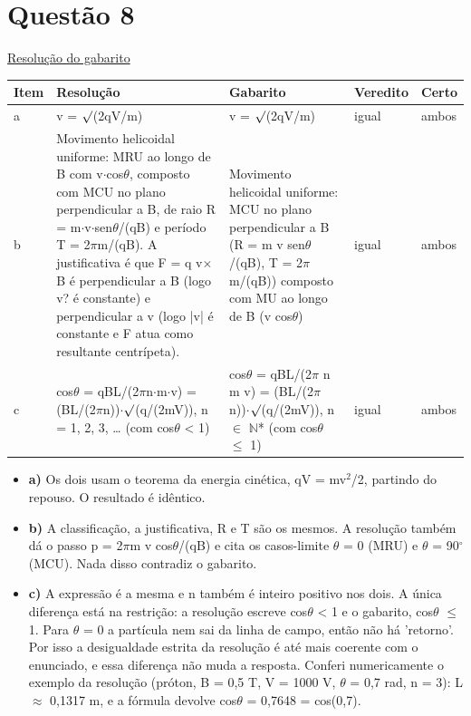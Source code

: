 \documentclass{article}%
\begin{document}
\section*{Questão 8}%
\href{https://poliedroresolve.sistemapoliedro.com.br/vestibulares/ita/2027/ita-2-fase-dia-3-22-10-2026-2-fase-dia-3/dissertativa-8-fisica-2-fase-dia-3-ita-2027}{Resolução do gabarito}\par\smallskip%
\begin{longtable}{@{}p{} p{} p{} p{} p{}@{}}\toprule Item & Resolução & Gabarito & Veredito & Certo \\ \midrule
a & v = $\surd$(2qV/m) & v = $\surd$(2qV/m) & igual & ambos \\
b & Movimento helicoidal uniforme: MRU ao longo de B com v$\cdot$cos$\theta$, composto com MCU no plano perpendicular a B, de raio R = m$\cdot$v$\cdot$sen$\theta$/(qB) e período T = 2$\pi$m/(qB). A justificativa é que F = q v$\times$B é perpendicular a B (logo v? é constante) e perpendicular a v (logo |v| é constante e F atua como resultante centrípeta). & Movimento helicoidal uniforme: MCU no plano perpendicular a B (R = m v sen$\theta$/(qB), T = 2$\pi$m/(qB)) composto com MU ao longo de B (v cos$\theta$) & igual & ambos \\
c & cos$\theta$ = qBL/(2$\pi$n$\cdot$m$\cdot$v) = (BL/(2$\pi$n))$\cdot$$\surd$(q/(2mV)), n = 1, 2, 3, \ldots{} (com cos$\theta$ < 1) & cos$\theta$ = qBL/(2$\pi$ n m v) = (BL/(2$\pi$ n))$\cdot$$\surd$(q/(2mV)), n $\in$ $\mathbb{N}$* (com cos$\theta$ $\leq$ 1) & igual & ambos \\
\bottomrule\end{longtable}%
\begin{itemize}%
\item%
\textbf{a)} Os dois usam o teorema da energia cinética, qV = mv$^2$/2, partindo do repouso. O resultado é idêntico.%
\item%
\textbf{b)} A classificação, a justificativa, R e T são os mesmos. A resolução também dá o passo p = 2$\pi$m v cos$\theta$/(qB) e cita os casos{-}limite $\theta$ = 0 (MRU) e $\theta$ = 90$^\circ$ (MCU). Nada disso contradiz o gabarito.%
\item%
\textbf{c)} A expressão é a mesma e n também é inteiro positivo nos dois. A única diferença está na restrição: a resolução escreve cos$\theta$ < 1 e o gabarito, cos$\theta$ $\leq$ 1. Para $\theta$ = 0 a partícula nem sai da linha de campo, então não há 'retorno'. Por isso a desigualdade estrita da resolução é até mais coerente com o enunciado, e essa diferença não muda a resposta. Conferi numericamente o exemplo da resolução (próton, B = 0,5 T, V = 1000 V, $\theta$ = 0,7 rad, n = 3): L $\approx$ 0,1317 m, e a fórmula devolve cos$\theta$ = 0,7648 = cos(0,7).%
\end{itemize}%
\end{document}
